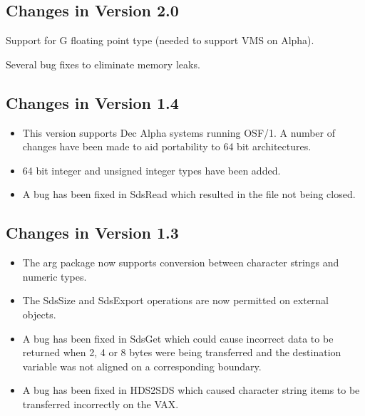 \subsection{Changes in Version 2.0}

Support for G floating point type (needed to support VMS on Alpha).

Several bug fixes to eliminate memory leaks.

\subsection{Changes in Version 1.4}

\begin{itemize}

\item This version supports Dec Alpha systems running OSF/1. A number of
changes have been made to aid portability to 64 bit architectures.

\item 64 bit integer and unsigned integer types have been added.

\item A bug has been fixed in SdsRead which resulted in the file not
being closed.

\end{itemize}

\subsection{Changes in Version 1.3}

\begin{itemize}

\item The arg package now supports conversion between character strings and
numeric types.

\item The SdsSize and SdsExport operations are now permitted on external
objects.

\item A bug has been fixed in SdsGet which could cause incorrect data to be
returned when 2, 4 or 8 bytes were being transferred and the destination
variable was not aligned on a corresponding boundary.

\item A bug has been fixed in HDS2SDS which caused character string items
to be transferred incorrectly on the VAX.

\end{itemize}

